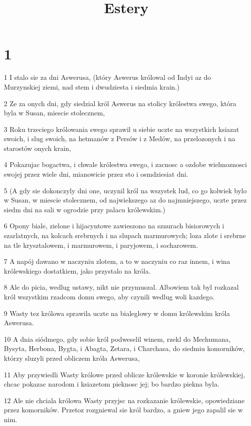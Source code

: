 

\title{Estery}


\chapter{1}

\par 1 I stalo sie za dni Aswerusa, (który Aswerus królowal od Indyi az do Murzynskiej ziemi, nad stem i dwudziesta i siedmia krain.)
\par 2 Ze za onych dni, gdy siedzial król Aswerus na stolicy królestwa swego, która byla w Susan, miescie stolecznem,
\par 3 Roku trzeciego królowania swego sprawil u siebie uczte na wszystkich ksiazat swoich, i slug swoich, na hetmanów z Persów i z Medów, na przelozonych i na starostów onych krain,
\par 4 Pokazujac bogactwa, i chwale królestwa swego, i zacnosc a ozdobe wielmoznosci swojej przez wiele dni, mianowicie przez sto i osmdziesiat dni.
\par 5 (A gdy sie dokonczyly dni one, uczynil król na wszystek lud, co go kolwiek bylo w Susan, w miescie stolecznem, od najwiekszego az do najmniejszego, uczte przez siedm dni na sali w ogrodzie przy palacu królewskim.)
\par 6 Opony biale, zielone i hijacyntowe zawieszono na sznurach bisiorowych i szarlatnych, na kolcach srebrnych i na slupach marmurowych; loza zlote i srebrne na tle krysztalowem, i marmurowem, i paryjowem, i socharowem.
\par 7 A napój dawano w naczyniu zlotem, a to w naczyniu co raz innem, i wina królewskiego dostatkiem, jako przystalo na króla.
\par 8 Ale do picia, wedlug ustawy, nikt nie przymuszal. Albowiem tak byl rozkazal król wszystkim rzadcom domu swego, aby czynili wedlug woli kazdego.
\par 9 Wasty tez królowa sprawila uczte na bialeglowy w domu królewskim króla Aswerusa.
\par 10 A dnia siódmego, gdy sobie król podweselil winem, rzekl do Mechumana, Bysyta, Herbona, Bygta, i Abagta, Zetara, i Charchasa, do siedmiu komorników, którzy sluzyli przed obliczem króla Aswerusa,
\par 11 Aby przywiedli Wasty królowe przed oblicze królewskie w koronie królewskiej, chcac pokazac narodom i ksiazetom pieknosc jej; bo bardzo piekna byla.
\par 12 Ale nie chciala królowa Wasty przyjsc na rozkazanie królewskie, opowiedziane przez komorników. Przetoz rozgniewal sie król bardzo, a gniew jego zapalil sie w nim.
